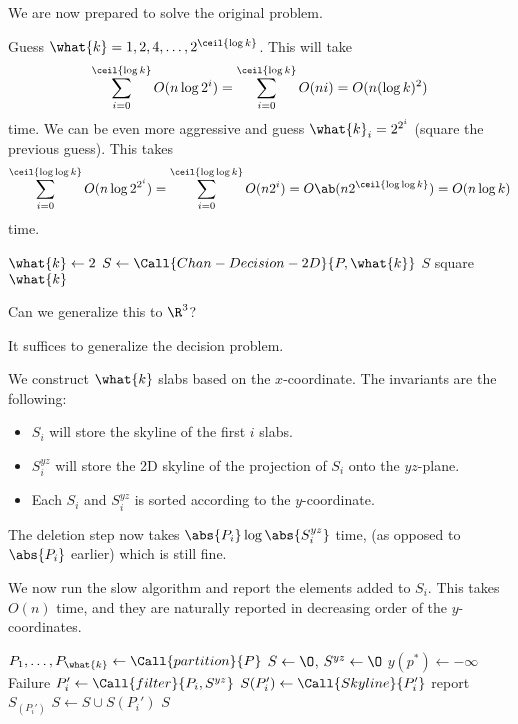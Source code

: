 We are now prepared to solve the original problem.
\begin{solution}
    Guess $\what{k} = 1, 2, 4, \ldots, 2^{\ceil{\log k}}$.
    This will take \[
        \sum_{i=0}^{\ceil{\log k}} O(n \log 2^i)
            = \sum_{i=0}^{\ceil{\log k}} O(n i)
            = O(n (\log k)^2)
    \] time.
    We can be even more aggressive and guess
    $\what{k}_i = 2^{2^i}$ (square the previous guess).
    This takes \[
        \sum_{i=0}^{\ceil{\log \log k}} O(n \log 2^{2^i})
            = \sum_{i=0}^{\ceil{\log \log k}} O(n 2^i)
            = O\ab(n 2^{\ceil{\log \log k}})
            = O(n \log k)
    \] time.
    \begin{algo}
            \State $\what{k} \gets 2$
                \State $S \gets \Call{Chan-Decision-2D}{P, \what{k}}$
                    \State \Return $S$
                \EndIf
                \State square $\what{k}$
            \EndFor
        \EndFn
    \end{algo}
\end{solution}

\begin{question*}
    Can we generalize this to $\R^3$?
\end{question*}
It suffices to generalize the decision problem.

\begin{solution}
    We construct $\what{k}$ slabs based on the $x$-coordinate.
    The invariants are the following:
    \begin{itemize}
        \item $S_i$ will store the skyline of the first $i$ slabs.
        \item $S_i^{yz}$ will store the 2D skyline of the projection of
            $S_i$ onto the $yz$-plane.
        \item Each $S_i$ and $S_i^{yz}$ is sorted according to the
            $y$-coordinate.
    \end{itemize}
    The deletion step now takes $\abs{P_i} \log \abs{S_i^{yz}}$ time,
    (as opposed to $\abs{P_i}$ earlier)
    which is still fine.

    We now run the slow algorithm and report the elements added to $S_i$.
    This takes $O(n)$ time, and they are naturally reported in decreasing
    order of the $y$-coordinates.
    \begin{algo}
            \State $P_1, \ldots, P_{\what{k}} \gets
                \Call{partition}{P}$
            \State $S \gets \O$, $S^{yz} \gets \O$
            \State $y(p^*) \gets -\infty$
                    \State \Return Failure
                \Else
                    \State $P_i' \gets \Call{filter}{P_i, S^{yz}}$
                    \State $S(P_i') \gets \Call{Skyline}{P_i'}$
                    \State report $S_(P_i')$
                    \State $S \gets S \cup S(P_i')$
                \EndIf
            \EndFor
            \State \Return $S$
        \EndFn
    \end{algo}
\end{solution}
